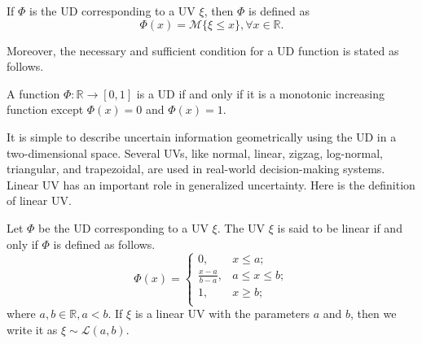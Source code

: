 \begin{definition}\cite{Liu 2015}\label{def.3}
 If $\Phi$ is the UD corresponding to a UV $\xi$, then $\Phi$ is defined as 
	\begin{equation*}
		\Phi(x)=\mathcal{M}\{\xi\le x\},\forall x\in \mathbb{R}.
	\end{equation*}
\end{definition}
\par Moreover, the necessary and sufficient condition for a UD function is stated as follows.
\begin{theorem}\cite{Liu 2015}\label{thm.1}
	A function $\Phi:\mathbb{R}\to[0,1]$ is a UD if and only if it is a monotonic increasing function except $\Phi(x)=0$ and $\Phi(x)=1$.
	\end{theorem}
\par It is simple to describe uncertain information geometrically using the UD in a two-dimensional space. Several UVs, like normal, linear, zigzag, log-normal, triangular, and trapezoidal, are used in real-world decision-making systems. Linear UV has an important role in generalized uncertainty. Here is the definition of linear UV.
\begin{definition}\cite{Liu 2015}\label{def.4}
	Let $\Phi$ be the UD corresponding to a UV $\xi$. The UV $\xi$ is said to be linear if and only if $\Phi$ is defined as follows.\\
	\[\Phi(x)=\left\{
	\begin{array}{ll}
		0, & x\leq a;\\
		\frac{x-a}{b-a}, & a\leq x\leq b;\\
		1, & x \geq b;\\
	\end{array}
	\right.
	\]
	where $a,b \in \mathbb{R}, a<b.$
	If $\xi$ is a linear UV with the parameters $a$ and $b$, then we write it as $\xi\sim \mathcal{L}(a,b).$
\end{definition}

